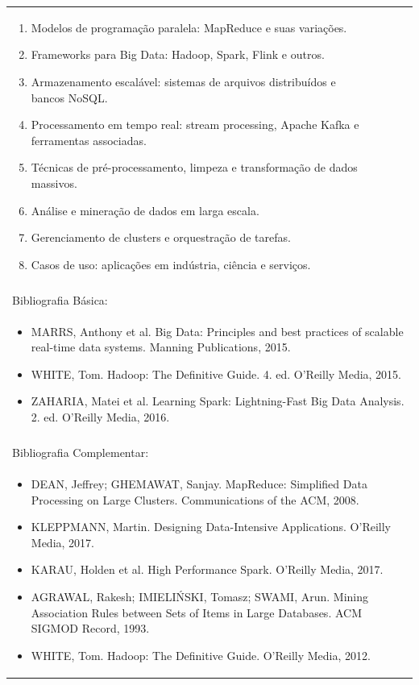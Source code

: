 \documentclass[11pt]{article}
\begin{document}
\begin{center}
\begin{longtable}{|p{4cm}|p{4cm}|p{4cm}|p{4cm}|}
{\begin{enumerate}
\item Modelos de programação paralela: MapReduce e suas variações.
\item Frameworks para Big Data: Hadoop, Spark, Flink e outros.
\item Armazenamento escalável: sistemas de arquivos distribuídos e bancos NoSQL.
\item Processamento em tempo real: stream processing, Apache Kafka e ferramentas associadas.
\item Técnicas de pré-processamento, limpeza e transformação de dados massivos.
\item Análise e mineração de dados em larga escala.
\item Gerenciamento de clusters e orquestração de tarefas.
\item Casos de uso: aplicações em indústria, ciência e serviços.\end{enumerate}}\\
\multicolumn{4}{|p{16cm}|}{}\\
\hline
\multicolumn{4}{|p{16cm}|}{Bibliografia Básica:}\\
\multicolumn{4}{|p{16cm}|}{%
\begin{itemize}\item MARRS, Anthony et al. Big Data: Principles and best practices of scalable real-time data systems. Manning Publications, 2015.
\item WHITE, Tom. Hadoop: The Definitive Guide. 4. ed. O'Reilly Media, 2015.
\item ZAHARIA, Matei et al. Learning Spark: Lightning-Fast Big Data Analysis. 2. ed. O'Reilly Media, 2016.\end{itemize}}\\
\multicolumn{4}{|p{16cm}|}{}\\
\hline
\multicolumn{4}{|p{16cm}|}{Bibliografia Complementar:}\\
\multicolumn{4}{|p{16cm}|}{%
\begin{itemize}\item DEAN, Jeffrey; GHEMAWAT, Sanjay. MapReduce: Simplified Data Processing on Large Clusters. Communications of the ACM, 2008.
\item KLEPPMANN, Martin. Designing Data-Intensive Applications. O'Reilly Media, 2017.
\item KARAU, Holden et al. High Performance Spark. O'Reilly Media, 2017.
\item AGRAWAL, Rakesh; IMIELIŃSKI, Tomasz; SWAMI, Arun. Mining Association Rules between Sets of Items in Large Databases. ACM SIGMOD Record, 1993.
\item WHITE, Tom. Hadoop: The Definitive Guide. O'Reilly Media, 2012.\end{itemize}}\\
\hline
\end{longtable}
\end{center}
\end{document}
